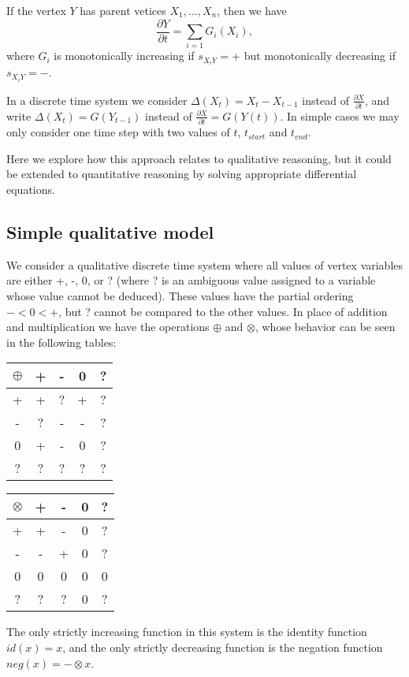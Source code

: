 \documentclass[a4paper,11pt]{article}
\begin{document}
If the vertex $Y$ has parent vetices $X_1,\ldots,X_n$, then we have
\[\frac{\partial Y}{\partial t} = \sum_{i=1}G_i(X_i),\]
where $G_i$ is monotonically increasing if $s_{X_iY}=+$ but monotonically
decreasing if $s_{X_iY}=-$.

In a discrete time system we consider $\Delta(X_t) = X_t - X_{t-1}$
instead of $\frac{\partial X}{\partial t}$, and write
$\Delta(X_t) = G(Y_{t-1})$ instead of
$\frac{\partial X}{\partial t} = G(Y(t))$.
%
In simple cases we may only consider one time step with two values of
$t$, $t_{start}$ and $t_{end}$.

Here we explore how this approach relates to qualitative reasoning,
but it could be extended to quantitative reasoning by solving
appropriate differential equations.

\subsection{Simple qualitative model}

We consider a qualitative discrete time system where all values of
vertex variables are either +, -, 0, or ? (where ? is an ambiguous value assigned
to a variable whose value cannot be deduced). These values have the partial
ordering $- < 0 < +$, but ? cannot be compared to the other values. In place of
addition and multiplication we have the operations $\oplus$ and $\otimes$, whose
behavior can be seen in the following tables:
\begin{center}
\begin{tabular}{c|cccc}
$\oplus$ & + & - & 0 & ?\\
\hline
  +   & +  & ? & + & ?\\
  -   & ?  & - & - & ?\\
  0   & +  & - & 0 & ?\\
  ?   & ?  & ? & ? & ?\\
\end{tabular}
\quad
\begin{tabular}{c|cccc}
$\otimes$ & + & - & 0 & ?\\
\hline
  +   & +  & - & 0 & ?\\
  -   & -  & + & 0 & ?\\
  0   & 0  & 0 & 0 & 0\\
  ?   & ?  & ? & 0 & ?\\
\end{tabular}
\end{center}
The only
strictly increasing function in this system is the identity function $id(x) =
x$, and the only strictly decreasing function is the negation function $neg(x) =-\otimes x$.
\end{document}
